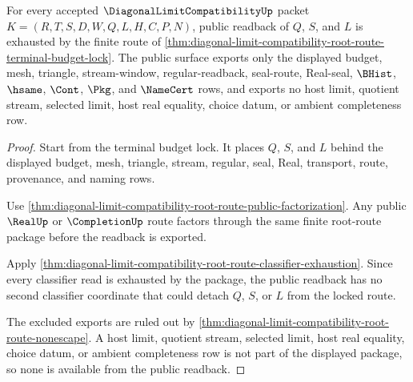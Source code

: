 \begin{theorem}
\label{thm:diagonal-limit-compatibility-root-route-public-readback-exhaustion}
For every accepted $\DiagonalLimitCompatibilityUp$ packet $K=(R,T,S,D,W,Q,L,H,C,P,N)$, public readback of $Q$, $S$, and $L$ is exhausted by the finite route of \autoref{thm:diagonal-limit-compatibility-root-route-terminal-budget-lock}. The public surface exports only the displayed budget, mesh, triangle, stream-window, regular-readback, seal-route, Real-seal, $\BHist$, $\hsame$, $\Cont$, $\Pkg$, and $\NameCert$ rows, and exports no host limit, quotient stream, selected limit, host real equality, choice datum, or ambient completeness row.
\end{theorem}
\begin{proof}
Start from the terminal budget lock. It places $Q$, $S$, and $L$ behind the displayed budget, mesh, triangle, stream, regular, seal, Real, transport, route, provenance, and naming rows.

Use \autoref{thm:diagonal-limit-compatibility-root-route-public-factorization}. Any public $\RealUp$ or $\CompletionUp$ route factors through the same finite root-route package before the readback is exported.

Apply \autoref{thm:diagonal-limit-compatibility-root-route-classifier-exhaustion}. Since every classifier read is exhausted by the package, the public readback has no second classifier coordinate that could detach $Q$, $S$, or $L$ from the locked route.

The excluded exports are ruled out by \autoref{thm:diagonal-limit-compatibility-root-route-nonescape}. A host limit, quotient stream, selected limit, host real equality, choice datum, or ambient completeness row is not part of the displayed package, so none is available from the public readback.
\end{proof}

